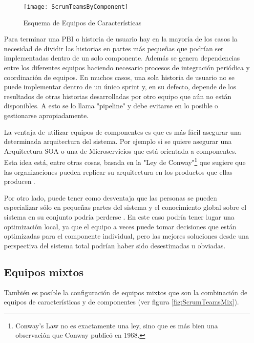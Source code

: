 \begin{figure}[h]
  \centering
  \texttt{[image: ScrumTeamsByComponent]}
  \caption{Esquema de Equipos de Características}
  \centering
  \label{fig:ScrumTeamsByComponent} %
\end{figure}

Para terminar una PBI o historia de usuario hay en la mayoría de los casos la necesidad de dividir las historias en partes más pequeñas que podrían ser implementadas dentro de un solo componente. Además se genera dependencias entre los diferentes equipos haciendo necesario procesos de integración periódica y coordinación de equipos. En muchos casos, una sola historia de usuario no se puede implementar dentro de un único sprint y, en su defecto, depende de los resultados de otras historias desarrolladas por otro equipo que aún no están disponibles. A esto se lo llama "pipeline" y debe evitarse en lo posible o gestionarse apropiadamente.

La ventaja de utilizar equipos de componentes es que es más fácil asegurar una determinada arquitectura del sistema. Por ejemplo si se quiere asegurar una Arquitectura SOA o una de Microservicios que está orientada a componentes. Esta idea está, entre otras cosas, basada en la "Ley de Conway"\footnote{Conway's Law \cite{Conway-1968} no es exactamente una ley, sino que es más bien una observación que Conway publicó en 1968.} que sugiere que las organizaciones pueden replicar su arquitectura en los productos que ellas producen \cite{Martin-Fowler-2014}. 

Por otro lado, puede tener como desventaja que las personas se pueden especializar sólo en pequeñas partes del sistema y el conocimiento global sobre el sistema en su conjunto podría perderse \cite{Scrum-Institute-2015}. En este caso podría tener lugar una optimización local, ya que el equipo a veces puede tomar decisiones que están optimizadas para el componente individual, pero las mejores soluciones desde una perspectiva del sistema total podrían haber sido desestimadas u obviadas.


\subsection{Equipos mixtos}

También es posible la configuración de equipos mixtos que son la combinación de equipos de características y de componentes (ver figura \ref{fig:ScrumTeamsMix}).

